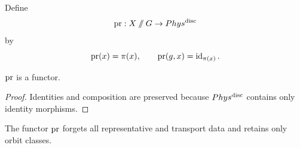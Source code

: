 \begin{definition}
	Define
	\[
		\operatorname{pr}:X\mathbin{/\mkern-6mu/} G\to Phys^{\mathrm{disc}}
	\]
	by
	\[
		\operatorname{pr}(x)=\pi(x),
		\qquad
		\operatorname{pr}(g,x)=\operatorname{id}_{\pi(x)} .
	\]
\end{definition}
\begin{lemma}
	\(\operatorname{pr}\) is a functor.
\end{lemma}
\begin{proof}
	Identities and composition are preserved because
	\(Phys^{\mathrm{disc}}\) contains only identity morphisms.
\end{proof}
\begin{remark}
	The functor \(\operatorname{pr}\) forgets all representative and transport data and
	retains only orbit classes.
\end{remark}

